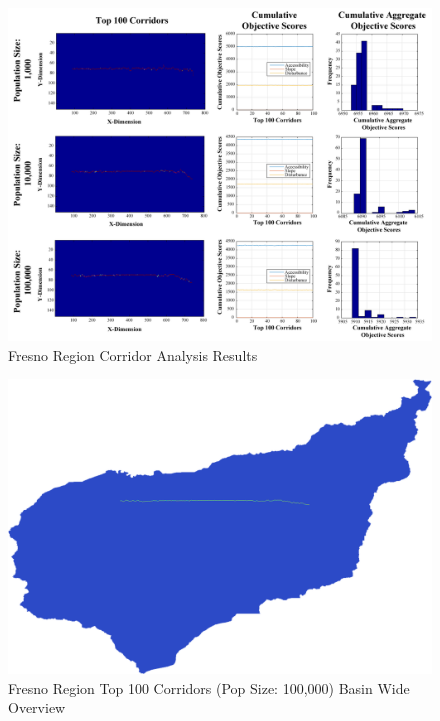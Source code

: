         \begin{figure}[!h]
            \begin{center}
            \includegraphics[width=6in]{figures/Fresno_PathwayResults.png}   
            \caption{Fresno Region Corridor Analysis Results}
            \label{fig:Fresults}
            \end{center}
        \end{figure}

        \begin{figure}[!h]
            \begin{center}
            \includegraphics[width=5.5in]{figures/Fresno_PathwayLarge.png}   
            \caption{Fresno Region Top 100 Corridors (Pop Size: 100,000) Basin Wide Overview}
            \label{fig:FsolutionOverview}
            \end{center}
        \end{figure}

